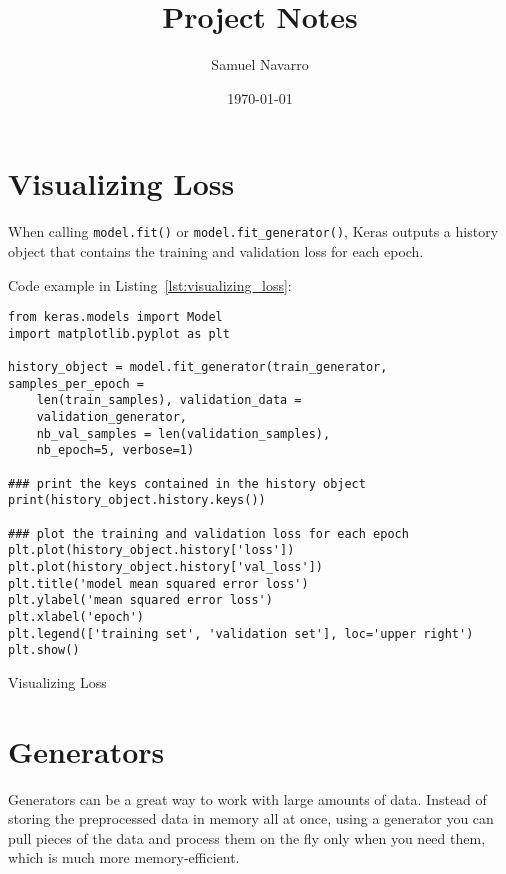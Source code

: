 \documentclass[11pt, a4paper]{article}
\begin{document}
\title{Project Notes}
\author{Samuel Navarro}
\date{\today}
\maketitle
\tableofcontents{}


\section{Visualizing Loss}%
\label{sec:visualizing_loss}

When calling \texttt{model.fit()} or \texttt{model.fit\_generator()}, Keras outputs a history object that contains the training and validation loss for each epoch. 

Code example in Listing~\ref{lst:visualizing_loss}:

\begin{listing}
\begin{verbatim}
from keras.models import Model
import matplotlib.pyplot as plt

history_object = model.fit_generator(train_generator, samples_per_epoch =
    len(train_samples), validation_data = 
    validation_generator,
    nb_val_samples = len(validation_samples), 
    nb_epoch=5, verbose=1)

### print the keys contained in the history object
print(history_object.history.keys())

### plot the training and validation loss for each epoch
plt.plot(history_object.history['loss'])
plt.plot(history_object.history['val_loss'])
plt.title('model mean squared error loss')
plt.ylabel('mean squared error loss')
plt.xlabel('epoch')
plt.legend(['training set', 'validation set'], loc='upper right')
plt.show()
\end{verbatim}
\caption{Visualizing Loss}
\label{lst:visualizing_loss}
\end{listing}

\section{Generators}%
\label{sec:generators}

Generators can be a great way to work with large amounts of data. Instead of storing the preprocessed data in memory all at once, using a generator you can pull pieces of the data and process them on the fly only when you need them, which is much more memory-efficient.
\end{document}
